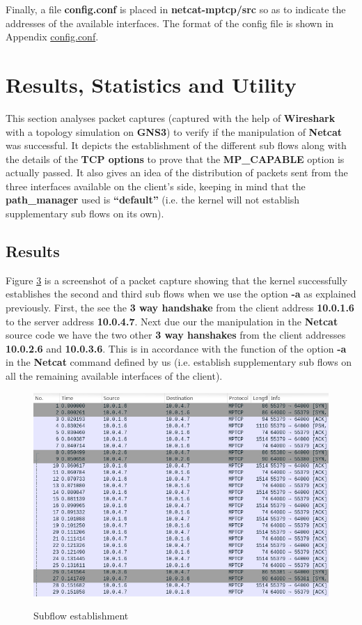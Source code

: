 \documentclass[a4paper,11pt]{article}
\begin{document}
			Finally, a file \textbf{config.conf} is placed in \textbf{netcat-mptcp/src} so as to indicate the addresses of the available interfaces. The format of the config file is shown in Appendix \hyperref[subsec:config.conf]{config.conf}.
			
	\clearpage
	\section{Results, Statistics and Utility}
		\label{sec:res}
		This section analyses packet captures (captured with the help of \textbf{Wireshark} with a topology simulation on \textbf{GNS3}) to verify if the manipulation of \textbf{Netcat} was successful. It depicts the establishment of the different sub flows along with the details of the \textbf{TCP options} to prove that the \textbf{MP\_CAPABLE} option is actually passed. It also gives an idea of the distribution of packets sent from the three interfaces available on the client's side, keeping in mind that the \textbf{path\_manager} used is \textbf{``default''} (i.e. the kernel will not establish supplementary sub flows on its own).
		\subsection{Results}
			\label{subsec:result}
			Figure \hyperref[fig:synack]{3} is a screenshot of a packet capture showing that the kernel successfully establishes the second and third sub flows when we use the option \textbf{-a} as explained previously. First, the see the \textbf{3 way handshake} from the client address \textbf{10.0.1.6} to the server address \textbf{10.0.4.7}. Next due our the manipulation in the \textbf{Netcat} source code we have the two other \textbf{3 way hanshakes} from the client addresses \textbf{10.0.2.6} and \textbf{10.0.3.6}. This is in accordance with the function of the option \textbf{-a} in the \textbf{Netcat} command defined by us (i.e. establish supplementary sub flows on all the remaining available interfaces of the client).
			\begin{figure}[h]
				\begin{center}
					\label{fig:synack}
					\includegraphics[scale=0.5]{pictures/synack.jpg}
					\caption[]{Subflow establishment}
				\end{center}
			\end{figure}
\end{document}
